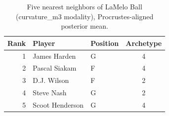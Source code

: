 \begin{table}[htbp]
  \centering\small
  \begin{tabular}{rllc}
    \toprule
    Rank & Player & Position & Archetype \\
    \midrule
    1 & James Harden & G & 4 \\
    2 & Pascal Siakam & F & 4 \\
    3 & D.J. Wilson & F & 2 \\
    4 & Steve Nash & G & 2 \\
    5 & Scoot Henderson & G & 4 \\
    \bottomrule
  \end{tabular}
  \caption{Five nearest neighbors of LaMelo Ball (curvature_m3 modality), Procrustes-aligned posterior mean.}
  \label{tab:LaMelo_Ball_neighbors_curvature_m3}
\end{table}

